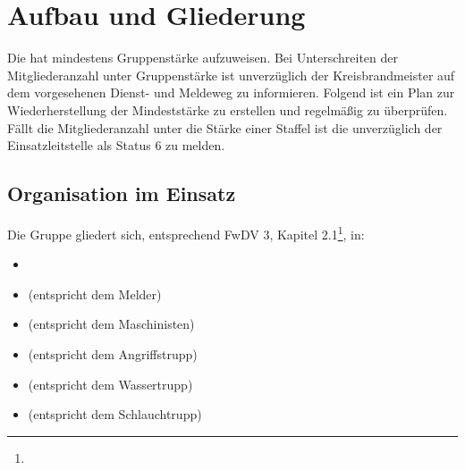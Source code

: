 \section{Aufbau und Gliederung}

Die \callee{} hat mindestens Gruppenstärke aufzuweisen. Bei Unterschreiten der Mitgliederanzahl unter Gruppenstärke ist unverzüglich der Kreisbrandmeister auf dem vorgesehenen Dienst- und Meldeweg zu informieren. Folgend ist ein Plan zur Wiederherstellung der Mindeststärke zu erstellen und regelmäßig zu überprüfen. Fällt die Mitgliederanzahl unter die Stärke einer Staffel ist die \callee{} unverzüglich der Einsatzleitstelle als Status 6 zu melden.

\subsection{Organisation im Einsatz}

Die Gruppe gliedert sich, entsprechend FwDV 3, Kapitel 2.1\footnote{\FwDVIII}, in:

\begin{itemize}
 \item \gruppenfuehrer
 \item \melder{} (entspricht dem Melder)
 \item \maschinist{} (entspricht dem Maschinisten)
 \item \angriffstrupp{} (entspricht dem Angriffstrupp)
 \item \wassertrupp{} (entspricht dem Wassertrupp)
 \item \schlauchtrupp{} (entspricht dem Schlauchtrupp)
\end{itemize}

